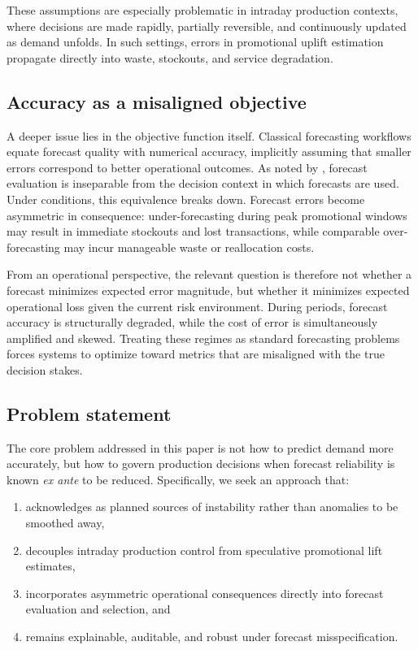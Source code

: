 These assumptions are especially problematic in intraday production contexts, where decisions are
made rapidly, partially reversible, and continuously updated as demand unfolds. In such settings,
errors in promotional uplift estimation propagate directly into waste, stockouts, and service
degradation.

\subsection{Accuracy as a misaligned objective}
\label{subsec:accuracy-misalignment}

A deeper issue lies in the objective function itself. Classical forecasting workflows equate forecast
quality with numerical accuracy, implicitly assuming that smaller errors correspond to better
operational outcomes. As noted by \citet{gneiting2011}, forecast evaluation is inseparable from the
decision context in which forecasts are used. Under \LTO{} conditions, this equivalence breaks down.
Forecast errors become asymmetric in consequence: under-forecasting during peak promotional
windows may result in immediate stockouts and lost transactions, while comparable over-forecasting
may incur manageable waste or reallocation costs.

From an operational perspective, the relevant question is therefore not whether a forecast minimizes
expected error magnitude, but whether it minimizes expected operational loss given the current risk
environment. During \LTO{} periods, forecast accuracy is structurally degraded, while the cost of
error is simultaneously amplified and skewed. Treating these regimes as standard forecasting
problems forces systems to optimize toward metrics that are misaligned with the true decision
stakes.

\subsection{Problem statement}
\label{subsec:problem-statement}

The core problem addressed in this paper is not how to predict \LTO{} demand more accurately, but
how to govern production decisions when forecast reliability is known \emph{ex ante} to be reduced.
Specifically, we seek an approach that:
\begin{enumerate}[leftmargin=*, itemsep=2pt]
  \item acknowledges \LTOs{} as planned sources of instability rather than anomalies to be smoothed
  away,
  \item decouples intraday production control from speculative promotional lift estimates,
  \item incorporates asymmetric operational consequences directly into forecast evaluation and
  selection, and
  \item remains explainable, auditable, and robust under forecast misspecification.
\end{enumerate}

